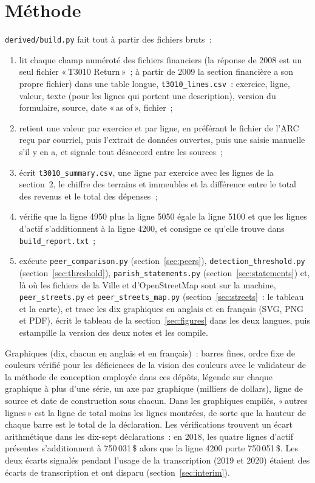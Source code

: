 \documentclass[11pt,letterpaper]{article}
\newcommand{\D}[1]{#1\,\$}
\begin{document}
\section{Méthode}\label{sec:method}

\texttt{derived/build.py} fait tout à partir des fichiers bruts~:
\begin{enumerate}[nosep,leftmargin=1.6em]
\item lit chaque champ numéroté des fichiers financiers (la réponse de 2008 est un seul fichier «\,T3010 Return\,»~; à partir de 2009 la section financière a son propre fichier) dans une table longue, \texttt{t3010\_lines.csv}~: exercice, ligne, valeur, texte (pour les lignes qui portent une description), version du formulaire, source, date «\,as of\,», fichier~;
\item retient une valeur par exercice et par ligne, en préférant le fichier de l'ARC reçu par courriel, puis l'extrait de données ouvertes, puis une saisie manuelle s'il y en a, et signale tout désaccord entre les sources~;
\item écrit \texttt{t3010\_summary.csv}, une ligne par exercice avec les lignes de la section~2, le chiffre des terrains et immeubles et la différence entre le total des revenus et le total des dépenses~;
\item vérifie que la ligne 4950 plus la ligne 5050 égale la ligne 5100 et que les lignes d'actif s'additionnent à la ligne 4200, et consigne ce qu'elle trouve dans \texttt{build\_report.txt}~;
\item exécute \texttt{peer\_comparison.py} (section~\ref{sec:peers}), \texttt{detection\_threshold.py} (section~\ref{sec:threshold}), \texttt{parish\_statements.py} (section~\ref{sec:statements}) et, là où les fichiers de la Ville et d'OpenStreetMap sont sur la machine, \texttt{peer\_streets.py} et \texttt{peer\_streets\_map.py} (section~\ref{sec:streets}~: le tableau et la carte), et trace les dix graphiques en anglais et en français (SVG, PNG et PDF), écrit le tableau de la section~\ref{sec:figures} dans les deux langues, puis estampille la version des deux notes et les compile.
\end{enumerate}

Graphiques (dix, chacun en anglais et en français)~: barres fines, ordre fixe de couleurs vérifié pour les déficiences de la vision des couleurs avec le validateur de la méthode de conception employée dans ces dépôts, légende sur chaque graphique à plus d'une série, un axe par graphique (milliers de dollars), ligne de source et date de construction sous chacun. Dans les graphiques empilés, «\,autres lignes\,» est la ligne de total moins les lignes montrées, de sorte que la hauteur de chaque barre est le total de la déclaration. Les vérifications trouvent un écart arithmétique dans les dix-sept déclarations~: en 2018, les quatre lignes d'actif présentes s'additionnent à \D{750\,031} alors que la ligne 4200 porte \D{750\,051}. Les deux écarts signalés pendant l'usage de la transcription (2019 et 2020) étaient des écarts de transcription et ont disparu (section~\ref{sec:interim}).
\end{document}
